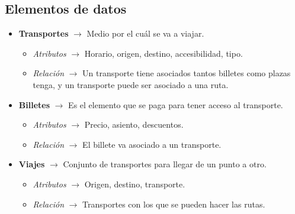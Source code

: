 \subsection{Elementos de datos}
\begin{itemize}
    \item \textbf{Transportes} $\rightarrow$ Medio por el cuál se va a viajar.
    \begin{itemize}
        \item \textit{Atributos} $\rightarrow$ Horario, origen, destino, accesibilidad, tipo.
        \item \textit{Relación} $\rightarrow$ Un transporte tiene asociados tantos billetes como plazas tenga, y un transporte puede ser asociado a una ruta.
    \end{itemize}
    \item \textbf{Billetes} $\rightarrow$ Es el elemento que se paga para tener acceso al transporte.
    \begin{itemize}
        \item \textit{Atributos} $\rightarrow$ Precio, asiento, descuentos.
        \item \textit{Relación} $\rightarrow$ El billete va asociado a un transporte.
    \end{itemize}
    \item \textbf{Viajes} $\rightarrow$ Conjunto de transportes para llegar de un punto a otro.
    \begin{itemize}
        \item \textit{Atributos} $\rightarrow$ Origen, destino, transporte.
        \item \textit{Relación} $\rightarrow$ Transportes con los que se pueden hacer las rutas.
    \end{itemize}
\end{itemize} 

